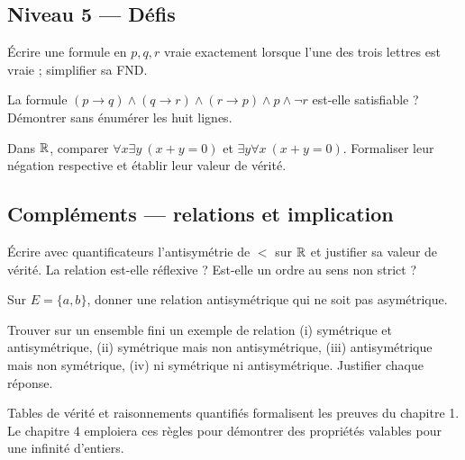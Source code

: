 \subsection*{Niveau 5 — Défis}
\begin{exercice}\label{ex:prop:16}Écrire une formule en $p,q,r$ vraie exactement lorsque l'une des trois lettres est vraie ; simplifier sa FND.\end{exercice}
\begin{exercice}\label{ex:prop:17}La formule $(p\to q)\wedge(q\to r)\wedge(r\to p)\wedge p\wedge\neg r$ est-elle satisfiable ? Démontrer sans énumérer les huit lignes.\end{exercice}
\begin{exercice}\label{ex:prop:18}Dans $\mathbb R$, comparer $\forall x\exists y\ (x+y=0)$ et $\exists y\forall x\ (x+y=0)$. Formaliser leur négation respective et établir leur valeur de vérité.\end{exercice}


\subsection*{Compléments — relations et implication}
\begin{exercice}\label{ex:prop:19}
Écrire avec quantificateurs l'antisymétrie de $<$ sur $\mathbb R$ et justifier sa valeur de vérité.
La relation est-elle réflexive ? Est-elle un ordre au sens non strict ?
\end{exercice}
\begin{exercice}\label{ex:prop:20}
Sur $E=\{a,b\}$, donner une relation antisymétrique qui ne soit pas asymétrique.
\end{exercice}
\begin{exercice}\label{ex:prop:21}
Trouver sur un ensemble fini un exemple de relation (i) symétrique et antisymétrique,
(ii) symétrique mais non antisymétrique, (iii) antisymétrique mais non symétrique,
(iv) ni symétrique ni antisymétrique. Justifier chaque réponse.
\end{exercice}


\begin{retenir}Tables de vérité et raisonnements quantifiés formalisent les preuves du chapitre 1. Le chapitre 4 emploiera ces règles pour démontrer des propriétés valables pour une infinité d'entiers.\end{retenir}
